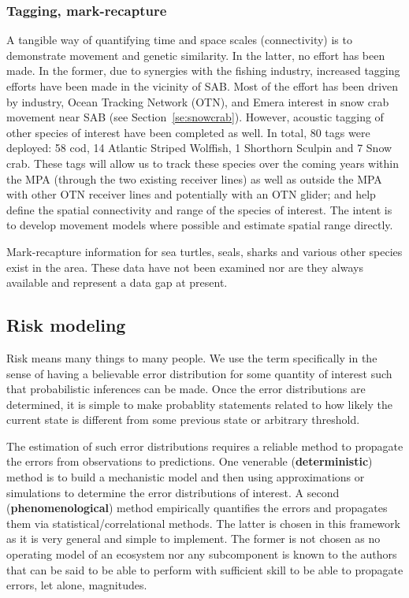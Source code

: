 \documentclass[letterpaper,portrait,11pt]{scrartcl}
\numberwithin{equation}{section}    %
\numberwithin{figure}{section}    %
\numberwithin{table}{section}       %
\begin{document}
\subsubsection{Tagging, mark-recapture}

A tangible way of quantifying time and space scales (connectivity) is to demonstrate movement and genetic similarity. In the latter, no effort has been made.  In the former, due to synergies with the fishing industry, increased tagging efforts have been made in the vicinity of SAB. Most of the effort has been driven by industry, Ocean Tracking Network (OTN), and Emera interest in snow crab movement near SAB (see Section~\ref{se:snowcrab}). However, acoustic tagging of other species of interest have been completed as well. In total, 80 tags were deployed: 58 cod, 14 Atlantic Striped Wolffish, 1 Shorthorn Sculpin and 7 Snow crab. These tags will allow us to track these species over the coming years within the MPA (through the two existing receiver lines) as well as outside the MPA with other OTN receiver lines and potentially with an OTN glider; and help define the spatial connectivity and range of the species of interest. The intent is to develop movement models where possible and estimate spatial range directly.

Mark-recapture information for sea turtles, seals, sharks and various other species exist in the area. These data have not been examined nor are they always available and represent a data gap at present.


\subsection{Risk modeling}
\label{sec:riskapproach}

Risk means many things to many people. We use the term specifically in the sense of having a believable error distribution for some quantity of interest such that probabilistic inferences can be made. Once the error distributions are determined, it is simple to make probablity statements related to how likely the current state is different from some previous state or arbitrary threshold.

The estimation of such error distributions requires a reliable method to propagate the errors from observations to predictions. One venerable (\textbf{deterministic}) method is to build a mechanistic model and then using approximations or simulations to determine the error distributions of interest. A second (\textbf{phenomenological}) method empirically quantifies the errors and propagates them via statistical/correlational methods. The latter is chosen in this framework as it is very general and simple to implement. The former is not chosen as no operating model of an ecosystem nor any subcomponent is known to the authors that can be said to be able to perform with sufficient skill to be able to propagate errors, let alone, magnitudes.
\end{document}
